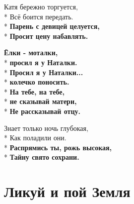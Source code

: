 \begin{minipage}{\linewidth}
Катя бережно торгуется,\\*
Всё боится передать.\\*
\textbf{Парень с девицей целуется,}\\*
\textbf{Просит цену набавлять.}\\
\end{minipage}\par\medskip\nobreak

\medskip

\begin{minipage}{\linewidth}
\hspace*{1.5em}\textbf{Ёлки - моталки,}\\*
\hspace*{1.5em}\textbf{просил я у Наталки.}\\*
\hspace*{1.5em}\textbf{Просил я у Наталки... }\\*
\hspace*{1.5em}\textbf{колечко поносить.}\\*
\hspace*{1.5em}\textbf{На тебе, на тебе,}\\*
\hspace*{1.5em}\textbf{не сказывай матери,}\\*
\hspace*{1.5em}\textbf{Не рассказывай отцу.}\\
\end{minipage}\par\medskip\nobreak

\medskip

\begin{minipage}{\linewidth}
Знает только ночь глубокая,\\*
Как поладили они.\\*
\textbf{Распрямись ты, рожь высокая,}\\*
\textbf{Тайну свято сохрани.}\\
\end{minipage}

\vspace{\fill}\newpage

\section{Ликуй и пой Земля}
\label{song:Ликуй_и_пой_Земля}

